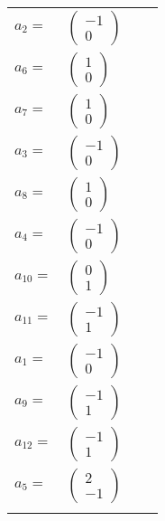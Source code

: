 \documentclass[1p]{elsarticle_modified}
\theoremstyle{definition}
\begin{document}
\begin{tabular}{m{7pt} m{180pt} m{7pt} m{180pt} }
\flushright $a_{2}=$&$\begin{pmatrix}-1\\0\end{pmatrix}$ \\
\flushright $a_{6}=$&$\begin{pmatrix}1\\0\end{pmatrix}$ \\
\flushright $a_{7}=$&$\begin{pmatrix}1\\0\end{pmatrix}$ \\
\flushright $a_{3}=$&$\begin{pmatrix}-1\\0\end{pmatrix}$ \\
\flushright $a_{8}=$&$\begin{pmatrix}1\\0\end{pmatrix}$ \\
\flushright $a_{4}=$&$\begin{pmatrix}-1\\0\end{pmatrix}$ \\
\flushright $a_{10}=$&$\begin{pmatrix}0\\1\end{pmatrix}$ \\
\flushright $a_{11}=$&$\begin{pmatrix}-1\\1\end{pmatrix}$ \\
\flushright $a_{1}=$&$\begin{pmatrix}-1\\0\end{pmatrix}$ \\
\flushright $a_{9}=$&$\begin{pmatrix}-1\\1\end{pmatrix}$ \\
\flushright $a_{12}=$&$\begin{pmatrix}-1\\1\end{pmatrix}$ \\
\flushright $a_{5}=$&$\begin{pmatrix}2\\-1\end{pmatrix}$\\&\end{tabular}
\end{document}
